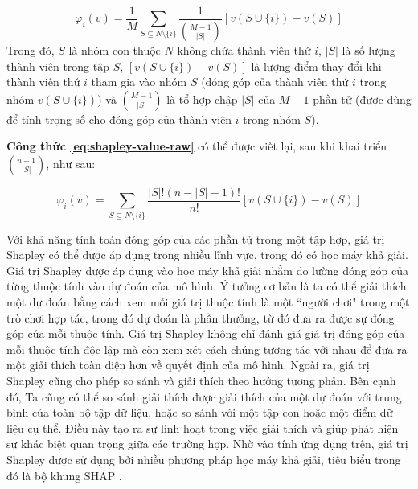 
\begin{equation} \label{eq:shapley-value-raw}
\varphi_i(v) = \frac{1}{M}\sum_{S \subseteq N \setminus \{i\}} \frac{1}{\binom{M - 1}{|S|}}\left[ v(S \cup \{i\}) - v(S) \right]
\end{equation}
Trong đó, $S$ là nhóm con thuộc $N$ không chứa thành viên thứ $i$, $|S|$ là số lượng thành viên trong tập $S$, $\left[ v(S \cup \{i\}) - v(S) \right]$ là lượng điểm thay đổi khi thành viên thứ $i$ tham gia vào nhóm $S$ (đóng góp của thành viên thứ $i$ trong nhóm $v(S \cup \{i\})$) và $\binom{M - 1}{|S|}$ là tổ hợp chập $|S|$ của $M-1$ phần tử (được dùng để tính trọng số cho đóng góp của thành viên $i$ trong nhóm $S$).

\bigbreak\noindent
\textbf{Công thức \ref{eq:shapley-value-raw}} có thể được viết lại, sau khi khai triển $\binom{n - 1}{|S|}$, như sau:

\begin{equation} \label{eq:shapley-value}
\varphi_i(v) = \sum_{S \subseteq N \setminus \{i\}} \frac{|S|!(n-|S|-1)!}{n!} \left[ v(S \cup \{i\}) - v(S) \right]
\end{equation}
\bigbreak\noindent

\bigbreak\noindent
Với khả năng tính toán đóng góp của các phần tử trong một tập hợp, giá trị Shapley có thể được áp dụng trong nhiều lĩnh vực, trong đó có học máy khả giải. Giá trị Shapley được áp dụng vào học máy khả giải nhằm đo lường đóng góp của từng thuộc tính vào dự đoán của mô hình. Ý tưởng cơ bản là ta có thể giải thích một dự đoán bằng cách xem mỗi giá trị thuộc tính là một ``người chơi" trong một trò chơi hợp tác, trong đó dự đoán là phần thưởng, từ đó đưa ra được sự đóng góp của mỗi thuộc tính. Giá trị Shapley không chỉ đánh giá giá trị đóng góp của mỗi thuộc tính độc lập mà còn xem xét cách chúng tương tác với nhau để đưa ra một giải thích toàn diện hơn về quyết định của mô hình. Ngoài ra, giá trị Shapley cũng cho phép so sánh và giải thích theo hướng tương phản. Bên cạnh đó, Ta cũng có thể so sánh giải thích được giải thích của một dự đoán với trung bình của toàn bộ tập dữ liệu, hoặc so sánh với một tập con hoặc một điểm dữ liệu cụ thể. Điều này tạo ra sự linh hoạt trong việc giải thích và giúp phát hiện sự khác biệt quan trọng giữa các trường hợp. Nhờ vào tính ứng dụng trên, giá trị Shapley được sử dụng bởi nhiều phương pháp học máy khả giải, tiêu biểu trong đó là bộ khung SHAP \cite{lundberg2017unified}.

